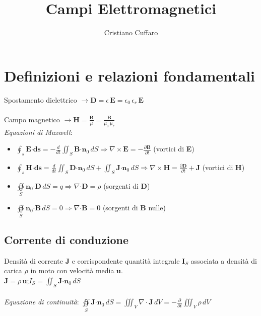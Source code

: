 \documentclass[a4paper]{article}
\let\oldoiint\oiint
\renewcommand{\oiint}{\oldoiint\limits}
\begin{document}
\author{Cristiano Cuffaro}
\title{Campi Elettromagnetici}
\maketitle

\section{Definizioni e relazioni fondamentali\\}

Spostamento dielettrico $\rightarrow \textbf{D} = \epsilon\,\textbf{E} = \epsilon_0\,\epsilon_r\,\textbf{E}$\\\\Campo magnetico $\rightarrow \textbf{H} = \frac{\textbf{B}}{\mu} = \frac{\textbf{B}}{\mu_0\,\mu_r}$\\

\emph{Equazioni di Maxwell}:

\begin{itemize}
\item $\oint_{s} \textbf{E·ds} = -\frac{d}{dt} \iint_{S} \textbf{B·n}_0 \,dS \Rightarrow \nabla\times\textbf{E} = -\frac{\partial\textbf{B}}{\partial t}$ (vortici di \textbf{E})

\item $\oint_{s} \textbf{H·ds} = \frac{d}{dt} \iint_{S} \textbf{D·n}_0 \,dS + \iint_{S}\textbf{J·n}_0 \,dS \Rightarrow \nabla\times\textbf{H} = \frac{\partial\textbf{D}}{\partial t} + \textbf{J}$ (vortici di \textbf{H})

\item$\oiint_{S}\textbf{n}_0\textbf{·D}\,dS = q \Rightarrow \nabla\textbf{·D} = \rho$ (sorgenti di \textbf{D})

\item$\oiint_{S}\textbf{n}_0\textbf{·B}\,dS = 0 \Rightarrow \nabla\textbf{·B} = 0$ (sorgenti di \textbf{B} nulle)
\end{itemize}

\subsection*{Corrente di conduzione}
Densità di corrente $\textbf{J}$ e corrispondente quantità integrale $\textbf{I}_S$ associata a densità di carica $\rho$ in moto con velocità media $\textbf{u}$.\\

$\textbf{J} = \rho\,\textbf{u}$;\hspace{10mm}$I_S = \iint_{S}\textbf{J·}\textbf{n}_0\,dS$\\\\
\emph{Equazione di continuità}: $\oiint_{S}\textbf{J·}\textbf{n}_0\,dS = \iiint_{V}\nabla\cdot\textbf{J}\,dV = -\frac{\partial}{\partial t}\iiint_{V}\rho\,dV$\\
\end{document}
